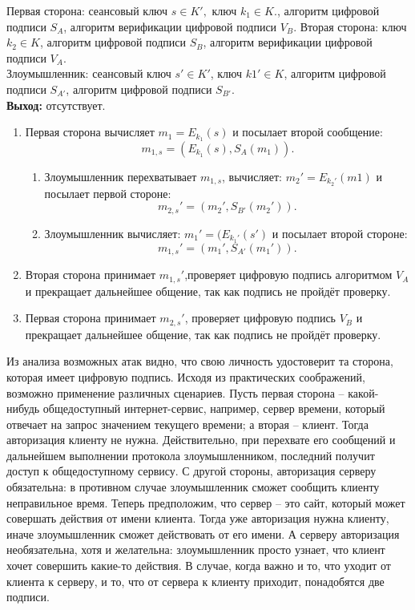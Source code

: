 Первая сторона: сеансовый ключ $s\in K',$ ключ $k_{1}\in K.$, алгоритм цифровой подписи $S_{A}$, алгоритм верификации цифровой подписи $V_{B}$.
Вторая сторона: ключ $k_{2}\in K$, алгоритм цифровой подписи $S_{B}$, алгоритм верификации цифровой подписи $V_{A}.$\\
Злоумышленник: сеансовый ключ $s' \in K'$,  ключ $k1'\in K$, алгоритм цифровой подписи $S_{A'}$, алгоритм цифровой подписи $S_{B'}$. \\
\hspace*{10mm}\textbf{Выход:} отсутствует.
\begin{enumerate}
	\item Первая сторона вычисляет $m_{1} = E_{k_{1}}(s)$ и посылает второй сообщение:
	$$m_{1,s} = (E_{k_{1}}(s), S_{A}(m_{1})).$$
	\begin{enumerate}
		\item Злоумышленник перехватывает $m_{1,s}$, вычисляет: $m_{2}' = E_{k_{2}'}(m1)$ и посылает первой стороне: 
		$$m_{2,s}'= (m_{2}',S_{B'}(m_{2}')).$$
		\item Злоумышленник вычисляет: $m_{1}' = (E_{k_{1}'}(s')$ и посылает второй стороне:
		$$m_{1,s}' = (m_{1}',S_{A'}(m_{1}')).$$
	\end{enumerate}
	\item Вторая сторона принимает $m_{1,s}'$,проверяет цифровую подпись алгоритмом $V_{A}$ и прекращает дальнейшее общение, так как подпись не пройдёт проверку.
	\item Первая сторона принимает $m_{2,s}'$, проверяет цифровую подпись $V_{B}$ и прекращает дальнейшее общение, так как подпись не пройдёт проверку.
\end{enumerate}
Из анализа возможных атак видно, что свою личность удостоверит та сторона, которая имеет цифровую подпись. Исходя из практических соображений, возможно применение различных сценариев. Пусть первая сторона – какой-нибудь общедоступный интернет-сервис, например, сервер времени, который отвечает на запрос значением текущего времени; а вторая – клиент. Тогда авторизация клиенту не нужна. Действительно, при перехвате его сообщений и дальнейшем выполнении протокола злоумышленником, последний получит доступ к общедоступному сервису. С другой стороны, авторизация серверу обязательна: в противном случае злоумышленник сможет сообщить клиенту неправильное время. Теперь предположим, что сервер – это сайт, который может совершать действия от имени клиента. Тогда уже авторизация нужна клиенту, иначе злоумышленник сможет действовать от его имени. А серверу авторизация необязательна, хотя и желательна: злоумышленник просто узнает, что клиент хочет совершить какие-то действия. В случае, когда важно и то, что уходит от клиента к серверу, и то, что от сервера к клиенту приходит, понадобятся две подписи. 
